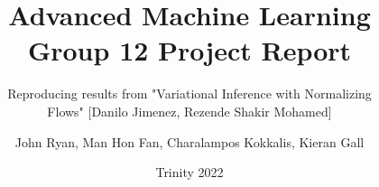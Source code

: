 \documentclass[12pt]{ociamthesis}
\title{Advanced Machine Learning \\
        Group 12 Project Report}
\subtitle{Reproducing results from "Variational Inference with Normalizing \\[1ex] Flows" [Danilo Jimenez, Rezende Shakir Mohamed]}
\author{John Ryan, Man Hon Fan, Charalampos Kokkalis, Kieran Gall}
\date{Trinity 2022}
\begin{document}
\setcounter{tocdepth}{3}


\maketitle

\begin{romanpages}
\tableofcontents
\end{romanpages}


          





\renewcommand{\bibname}{References}
\nocite{*}

\end{document}
